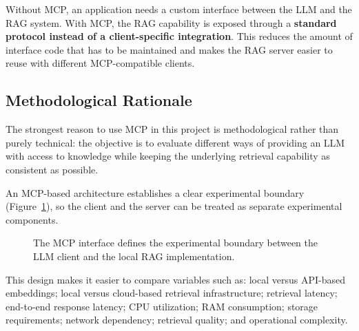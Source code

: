 \documentclass[11pt,a4paper]{article}
\begin{document}
Without MCP, an application needs a custom interface between the LLM and the
RAG system. With MCP, the RAG capability is exposed through a \textbf{standard
protocol instead of a client-specific integration}. This reduces the amount
of interface code that has to be maintained and makes the RAG server easier
to reuse with different MCP-compatible clients.

\subsection{Methodological Rationale}

The strongest reason to use MCP in this project is methodological rather than
purely technical: the objective is to evaluate different ways of providing an
LLM with access to knowledge while keeping the underlying retrieval
capability as consistent as possible.

An MCP-based architecture establishes a clear experimental boundary
(Figure~\ref{fig:boundary}), so the client and the server can be treated as
separate experimental components.

\begin{figure}[htbp]
\centering
{}
\caption{The MCP interface defines the experimental boundary between the LLM client and the local RAG implementation.}
\label{fig:boundary}
\end{figure}

This design makes it easier to compare variables such as: local versus
API-based embeddings; local versus cloud-based retrieval infrastructure;
retrieval latency; end-to-end response latency; CPU utilization; RAM
consumption; storage requirements; network dependency; retrieval quality; and
operational complexity.
\end{document}
